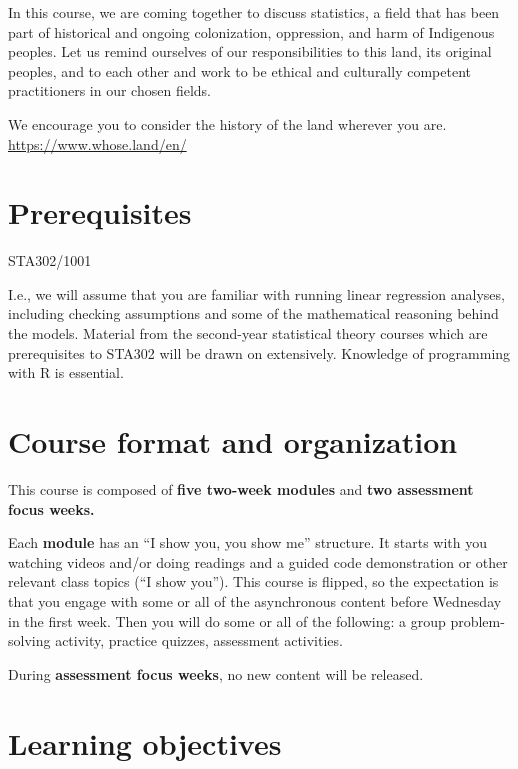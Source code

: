 \documentclass[
  openany]{book}
\begin{document}
In this course, we are coming together to discuss statistics, a field that has been part of historical and ongoing colonization, oppression, and harm of Indigenous peoples. Let us remind ourselves of our responsibilities to this land, its original peoples, and to each other and work to be ethical and culturally competent practitioners in our chosen fields.

We encourage you to consider the history of the land wherever you are. \url{https://www.whose.land/en/}

\hypertarget{prerequisites}{%
\section{Prerequisites}\label{prerequisites}}

STA302/1001

I.e., we will assume that you are familiar with running linear regression analyses, including checking assumptions and some of the mathematical reasoning behind the models. Material from the second-year statistical theory courses which are prerequisites to STA302 will be drawn on extensively. Knowledge of programming with R is essential.

\hypertarget{course-format-and-organization}{%
\section{Course format and organization}\label{course-format-and-organization}}

This course is composed of \textbf{five two-week modules} and \textbf{two assessment focus weeks.}

Each \textbf{module} has an ``I show you, you show me'' structure. It starts with you watching videos and/or doing readings and a guided code demonstration or other relevant class topics (``I show you''). This course is flipped, so the expectation is that you engage with some or all of the asynchronous content before Wednesday in the first week. Then you will do some or all of the following: a group problem-solving activity, practice quizzes, assessment activities.

During \textbf{assessment focus weeks}, no new content will be released.

\hypertarget{learning-objectives}{%
\section{Learning objectives}\label{learning-objectives}}
\end{document}
